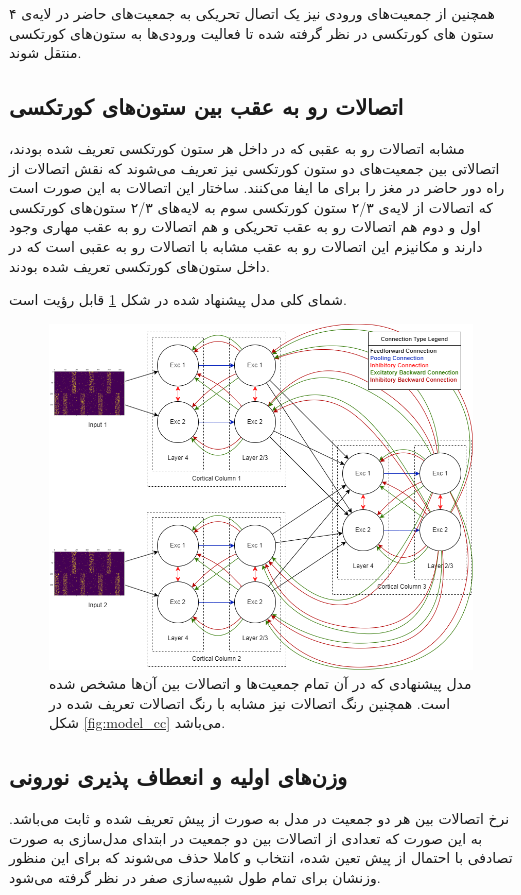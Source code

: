 \documentclass[12pt]{report}
\begin{document}
	همچنین از جمعیت‌های ورودی نیز یک اتصال تحریکی به جمعیت‌های حاضر در لایه‌ی ۴ ستون ‌های کورتکسی در نظر گرفته شده تا فعالیت ورودی‌ها به ستون‌های کورتکسی منتقل شوند.
	
	\subsection{اتصالات رو‌ به عقب بین ستون‌های کورتکسی}
	
	مشابه اتصالات رو به عقبی که در داخل هر ستون کورتکسی تعریف شده بودند، اتصالاتی بین جمعیت‌های دو ستون کورتکسی نیز تعریف می‌شوند که نقش اتصالات از راه دور حاضر در مغز را برای ما ایفا می‌کنند. ساختار این اتصالات به این صورت است که اتصالات از لایه‌ی ۲/۳ ستون کورتکسی سوم به لایه‌های ۲/۳ ستون‌های کورتکسی اول و دوم هم اتصالات رو به عقب تحریکی و هم اتصالات رو به عقب مهاری وجود دارند و مکانیزم این اتصالات رو به عقب مشابه با اتصالات رو به عقبی است که در داخل ستون‌های کورتکسی تعریف شده بودند.
	
	شمای کلی مدل پیشنهاد شده در شکل \ref{fig:model_overall} قابل رؤیت است.
	
	\begin{figure}[]
		\centering
		\includegraphics[width=1.0\linewidth]{model_overall.png}
		\caption[NS]{
			مدل پیشنهادی که در آن تمام جمعیت‌ها و اتصالات بین آن‌ها مشخص شده است. همچنین رنگ اتصالات نیز مشابه با رنگ اتصالات تعریف شده در شکل \ref{fig:model_cc} می‌باشد.
		}
		\label{fig:model_overall} 
	\end{figure}

	\subsection{وزن‌های اولیه و انعطاف پذیری نورونی}
	نرخ اتصالات بین هر دو جمعیت در مدل به صورت از پیش تعریف شده و ثابت می‌باشد. به این صورت که تعدادی از اتصالات بین دو جمعیت در ابتدای مدل‌سازی به صورت تصادفی با احتمال از پیش تعین شده، انتخاب و کاملا حذف می‌شوند که برای این منظور وزنشان برای تمام طول شبیه‌سازی صفر در نظر گرفته می‌شود.
	
\end{document}

